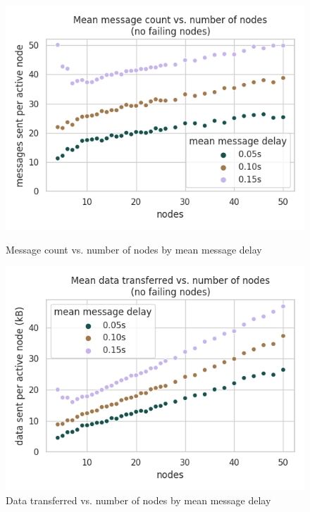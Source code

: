 \begin{figure}[H]
    \centering
    \begin{minipage}{0.5\textwidth}
        \centering
        \includegraphics[width=\textwidth]{figures/5/bandwidth_msg_tx_sum_by_num_nodes.png}
        \captionsetup{labelformat=empty}
        \caption{Message count vs. number of nodes by mean message delay}
    \end{minipage}\hfill
    \begin{minipage}{0.5\textwidth}
        \centering
        \includegraphics[width=\textwidth]{figures/5/bandwidth_tx_sum_by_num_nodes.png}
        \captionsetup{labelformat=empty}
        \caption{Data transferred vs. number of nodes by mean message delay}
    \end{minipage}\hfill
\end{figure}


